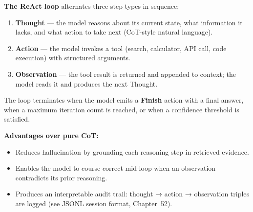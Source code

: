 \textbf{The ReAct loop} alternates three step types in sequence:

\begin{enumerate}
  \item \textbf{Thought} --- the model reasons about its current state, what
    information it lacks, and what action to take next (CoT-style natural language).
  \item \textbf{Action} --- the model invokes a tool (search, calculator, API call,
    code execution) with structured arguments.
  \item \textbf{Observation} --- the tool result is returned and appended to context;
    the model reads it and produces the next Thought.
\end{enumerate}

The loop terminates when the model emits a \textbf{Finish} action with a final
answer, when a maximum iteration count is reached, or when a confidence threshold
is satisfied.

\begin{center}
\end{center}

\textbf{Advantages over pure CoT:}
\begin{itemize}
  \item Reduces hallucination by grounding each reasoning step in retrieved evidence.
  \item Enables the model to course-correct mid-loop when an observation contradicts
    its prior reasoning.
  \item Produces an interpretable audit trail: thought → action → observation
    triples are logged (see JSONL session format, Chapter~52).
\end{itemize}

